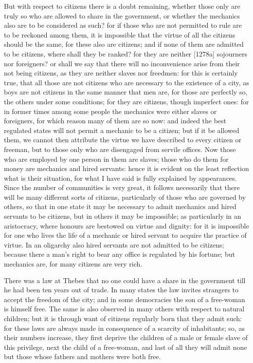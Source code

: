 
But with respect to citizens there is a doubt remaining, whether those
only are truly so who are allowed to share in the government, or whether
the mechanics also are to be considered as such? for if those who are not
permitted to rule are to be reckoned among them, it is impossible that the
virtue of all the citizens should be the same, for these also are
citizens; and if none of them are admitted to be citizens, where shall
they be ranked? for they are neither [1278a] sojourners nor foreigners? or
shall we say that there will no inconvenience arise from their not being
citizens, as they are neither slaves nor freedmen: for this is certainly
true, that all those are not citizens who are necessary to the existence
of a city, as boys are not citizens in the same manner that men are, for
those are perfectly so, the others under some conditions; for they are
citizens, though imperfect ones: for in former times among some people the
mechanics were either slaves or foreigners, for which reason many of them
are so now: and indeed the best regulated states will not permit a
mechanic to be a citizen; but if it be allowed them, we cannot then
attribute the virtue we have described to every citizen or freeman, but to
those only who are disengaged from servile offices. Now those who are
employed by one person in them are slaves; those who do them for money are
mechanics and hired servants: hence it is evident on the least reflection
what is their situation, for what I have said is fully explained by
appearances. Since the number of communities is very great, it follows
necessarily that there will be many different sorts of citizens,
particularly of those who are governed by others, so that in one state it
may be necessary to admit mechanics and hired servants to be citizens, but
in others it may be impossible; as particularly in an aristocracy, where
honours are bestowed on virtue and dignity: for it is impossible for one
who lives the life of a mechanic or hired servant to acquire the practice
of virtue. In an oligarchy also hired servants are not admitted to be
citizens; because there a man's right to bear any office is regulated by
his fortune; but mechanics are, for many citizens are very rich.

There was a law at Thebes that no one could have a share in the government
till he had been ten years out of trade. In many states the law invites
strangers to accept the freedom of the city; and in some democracies the
son of a free-woman is himself free. The same is also observed in many
others with respect to natural children; but it is through want of
citizens regularly born that they admit such: for these laws are always
made in consequence of a scarcity of inhabitants; so, as their numbers
increase, they first deprive the children of a male or female slave of
this privilege, next the child of a free-woman, and last of all they will
admit none but those whose fathers and mothers were both free.

